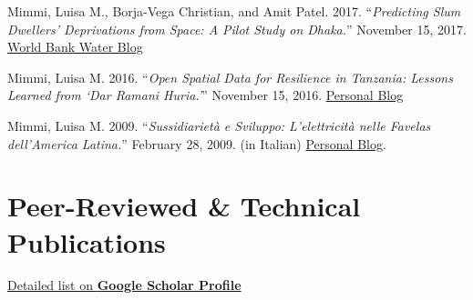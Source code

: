 \documentclass[10pt,a4paper,]{twentysecondcv}
\begin{document}
Mimmi, Luisa M., Borja-Vega Christian, and Amit Patel. 2017. \enquote{\emph{Predicting Slum Dwellers' Deprivations from Space: A Pilot Study on Dhaka.}} November 15, 2017. \href{https://blogs.worldbank.org/water/predicting-slum-dwellers-deprivations-space-pilot-study-dhaka}{World Bank Water Blog}

Mimmi, Luisa M. 2016. \enquote{\emph{Open Spatial Data for Resilience in Tanzania: Lessons Learned from \enquote{Dar Ramani Huria.}}} November 15, 2016. \href{https://lulliter.github.io/post/2016-11-15_ramani-huria/}{Personal Blog}

Mimmi, Luisa M. 2009. \enquote{\emph{Sussidiarietà e Sviluppo: L'elettricità nelle \emph{Favelas} dell'America Latina.}} February 28, 2009. (in Italian) \href{https://lulliter.github.io/post/sussidiariet\%C3\%A0-e-sviluppo/}{Personal Blog}.

\hypertarget{peer-reviewed-technical-publications}{%
\section{Peer-Reviewed \& Technical Publications}\label{peer-reviewed-technical-publications}}

\href{https://scholar.google.com/citations?user=OBYla5gAAAAJ\&hl=en\&oi=ao}{Detailed list on \textbf{Google Scholar Profile}}

\endfirstpage
\end{document}
